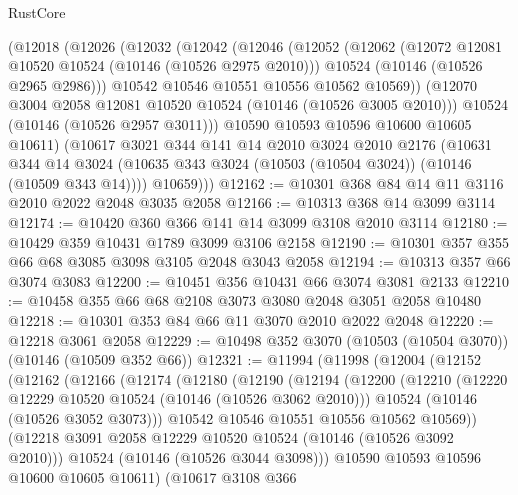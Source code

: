 \begin{lexlean}{RustCore}
\begin{coremodule}
    (@12018
      (@12026
        (@12032
          (@12042
            (@12046
              (@12052
                (@12062
                  (@12072 @12081 @10520 @10524 (@10146 (@10526 @2975 @2010)))
                  @10524
                  (@10146 (@10526 @2965 @2986)))
                @10542
                @10546
                @10551
                @10556
                @10562
                @10569))
            (@12070 @3004 @2058 @12081 @10520 @10524 (@10146 (@10526 @3005 @2010)))
            @10524
            (@10146 (@10526 @2957 @3011)))
          @10590
          @10593
          @10596
          @10600
          @10605
          @10611)
        (@10617
          @3021
          @344
          @141
          @14
          @2010
          @3024
          @2010
          @2176
          (@10631
            @344
            @14
            @3024
            (@10635 @343 @3024 (@10503 (@10504 @3024)) (@10146 (@10509 @343 @14))))
          @10659)))
@12162 := @10301 @368 @84 @14 @11 @3116 @2010 @2022 @2048 @3035 @2058
@12166 := @10313 @368 @14 @3099 @3114
@12174 := @10420 @360 @366 @141 @14 @3099 @3108 @2010 @3114
@12180 := @10429 @359 @10431 @1789 @3099 @3106 @2158
@12190 := @10301 @357 @355 @66 @68 @3085 @3098 @3105 @2048 @3043 @2058
@12194 := @10313 @357 @66 @3074 @3083
@12200 := @10451 @356 @10431 @66 @3074 @3081 @2133
@12210 := @10458 @355 @66 @68 @2108 @3073 @3080 @2048 @3051 @2058 @10480
@12218 := @10301 @353 @84 @66 @11 @3070 @2010 @2022 @2048
@12220 := @12218 @3061 @2058
@12229 := @10498 @352 @3070 (@10503 (@10504 @3070)) (@10146 (@10509 @352 @66))
@12321 := @11994
    (@11998
      (@12004
        (@12152
          (@12162
            (@12166
              (@12174
                (@12180
                  (@12190
                    (@12194
                      (@12200
                        (@12210
                          (@12220 @12229 @10520 @10524 (@10146 (@10526 @3062 @2010)))
                          @10524
                          (@10146 (@10526 @3052 @3073)))
                        @10542
                        @10546
                        @10551
                        @10556
                        @10562
                        @10569))
                    (@12218 @3091 @2058 @12229 @10520 @10524 (@10146 (@10526 @3092 @2010)))
                    @10524
                    (@10146 (@10526 @3044 @3098)))
                  @10590
                  @10593
                  @10596
                  @10600
                  @10605
                  @10611)
                (@10617
                  @3108
                  @366

\end{coremodule}
\end{lexlean}
